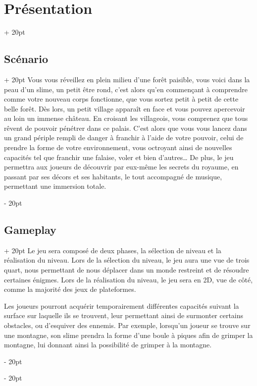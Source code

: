 \documentclass[a4paper, 12pt, twoside]{article}
\newcommand{\ind}[1][20pt]{\advance\leftskip + #1}
\newcommand{\deind}[1][20pt]{\advance\leftskip - #1}
\newenvironment{indt}[2][20pt]{#2 \par \ind[#1]}{\par \deind} %
\begin{document}

    \newpage

    \begin{indt}{\section{Présentation}}
        \begin{indt}{\subsection{Scénario}}
            Vous vous réveillez en plein milieu d'une forêt paisible, vous voici dans la peau d'un slime, un petit être rond, c'est alors qu'en commençant à comprendre comme votre nouveau corps fonctionne, que vous sortez petit à petit de cette belle forêt. Dès lors, un petit village apparaît en face et vous pouvez apercevoir au loin un immense château. En croisant les villageois, vous comprenez que tous rêvent de pouvoir pénétrer dans ce palais. C'est alors que vous vous lancez dans un grand périple rempli de danger à franchir à l'aide de votre pouvoir, celui de prendre la forme de votre environnement, vous octroyant ainsi de nouvelles capacités tel que franchir une falaise, voler et bien d'autres… De plus, le jeu permettra aux joueurs de découvrir par eux-même les secrets du royaume, en passant par ses décors et ses habitants, le tout accompagné de musique, permettant une immersion totale.
        \end{indt}
        
        \begin{indt}{\subsection{Gameplay}}
            Le jeu sera composé de deux phases, la sélection de niveau et la réalisation du niveau. Lors de la sélection du niveau, le jeu aura une vue de trois quart, nous permettant de nous déplacer dans un monde restreint et de résoudre certaines énigmes. Lors de la réalisation du niveau, le jeu sera en 2D, vue de côté, comme la majorité des jeux de plateformes.

           Les joueurs pourront acquérir temporairement différentes capacités suivant la surface sur laquelle ils se trouvent, leur permettant ainsi de surmonter certains obstacles, ou d'esquiver des ennemis. Par exemple, lorsqu'un joueur se trouve sur une montagne, son slime prendra la forme d'une boule à piques afin de grimper la montagne, lui donnant ainsi la possibilité de grimper à la montagne.


\end{indt}
\end{indt}
\end{document}
